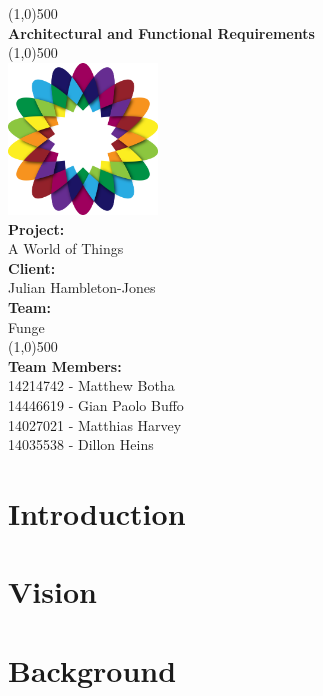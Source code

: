\documentclass{article}
\begin{document}
\begin{titlepage}
	\begin{center}
		\line(1,0){500}\\
		[6mm]
		\huge{\bfseries Architectural and Functional Requirements}\\
		\line(1,0){500}\\
			[5mm]
			\includegraphics[width=150px]{images/AWorldOfPlants.png}
			\\
		[5mm]
		\large\textbf{Project:}\\A World of Things\\
		[3mm]
		\large\textbf{Client:}\\Julian Hambleton-Jones\\
		[3mm]
		\large \textbf{Team:}\\Funge\\
		\line(1,0){500}\\
		[5mm]
		\large \textbf{Team Members:}\\
		[3mm]
		\large 14214742 - Matthew Botha\\
		\large 14446619 - Gian Paolo Buffo\\
		\large 14027021 - Matthias Harvey\\
        \large 14035538 - Dillon Heins\\[3mm]
	\end{center}
\end{titlepage}

\cleardoublepage
\thispagestyle{empty}
\tableofcontents

\cleardoublepage
\setcounter{page}{1}

\section{Introduction}

\section{Vision}

\section{Background}
\end{document}
